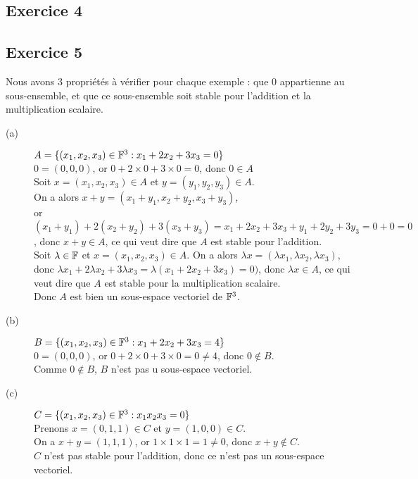 \documentclass[12pt]{book}
\begin{document}
\subsection*{Exercice 4}

\subsection*{Exercice 5}
Nous avons 3 propriétés à vérifier pour chaque exemple : que 0 appartienne au sous-ensemble, et que ce sous-ensemble soit stable pour l’addition et la multiplication scalaire.

\begin{description}
    \item[(a)] $A= \{(x_1,x_2,x_3)\in\mathbb{F}^3:x_1+2x_2+3x_3=0\} $\\
    $0=(0,0,0)$, or $0+2\times 0+3\times 0=0$, donc $0\in A$\\
    Soit $x=(x_1,x_2,x_3)\in A$ et $y=(y_1,y_2,y_3)\in A$.\\
    On a alors $x+y=(x_1+y_1,x_2+y_2,x_3+y_3)$, \\
    or $(x_1+y_1)+2(x_2+y_2)+3(x_3+y_3)=x_1+2x_2+3x_3+y_1+2y_2+3y_3=0+0=0$, donc $x+y\in A$, ce qui veut dire que $A$ est stable pour l’addition.\\
    Soit $\lambda \in\mathbb{F}$ et $x=(x_1,x_2,x_3)\in A$.
    On a alors $\lambda x=(\lambda x_1,\lambda x_2, \lambda x_3)$, donc $\lambda x_1+2\lambda x_2 +3\lambda x_3=\lambda(x_1+2x_2+3x_3)=0)$, donc $\lambda x\in A$, ce qui veut dire que $A$ est stable pour la multiplication scalaire.\\
    Donc $A$ est bien un sous-espace vectoriel de $\mathbb{F}^3$.\\
    
    \item[(b)] $B= \{(x_1,x_2,x_3)\in\mathbb{F}^3:x_1+2x_2+3x_3=4\} $\\
    $0=(0,0,0)$, or $0+2\times 0+3\times 0=0\ne 4$, donc $0\notin B$.\\
    Comme $0\notin B$, $B$ n’est pas u sous-espace vectoriel.
    
    \item[(c)] $C= \{(x_1,x_2,x_3)\in\mathbb{F}^3:x_1x_2x_3=0\} $\\
    Prenons $x=(0,1,1)\in C$ et $y=(1,0,0)\in C$.\\
    On a $x+y=(1,1,1)$, or $1\times 1\times 1=1\ne 0$, donc $x+y\notin C$.\\
    $C$ n’est pas stable pour l’addition, donc ce n’est pas un sous-espace vectoriel.
    

\end{description}
\end{document}

